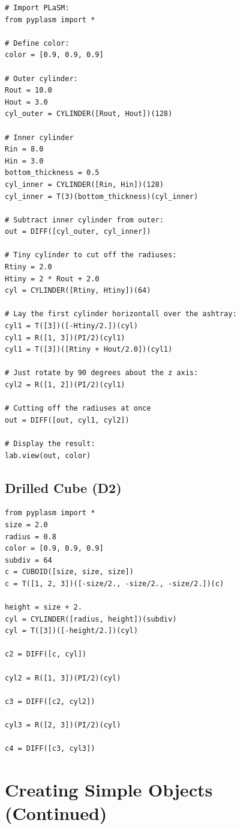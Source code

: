 \documentclass[article,A4,12pt]{llncs}
\begin{document}
\begin{verbatim}
# Import PLaSM:
from pyplasm import *

# Define color:
color = [0.9, 0.9, 0.9]

# Outer cylinder:
Rout = 10.0
Hout = 3.0
cyl_outer = CYLINDER([Rout, Hout])(128)

# Inner cylinder
Rin = 8.0
Hin = 3.0
bottom_thickness = 0.5
cyl_inner = CYLINDER([Rin, Hin])(128)
cyl_inner = T(3)(bottom_thickness)(cyl_inner)

# Subtract inner cylinder from outer:
out = DIFF([cyl_outer, cyl_inner])

# Tiny cylinder to cut off the radiuses:
Rtiny = 2.0
Htiny = 2 * Rout + 2.0
cyl = CYLINDER([Rtiny, Htiny])(64)

# Lay the first cylinder horizontall over the ashtray:
cyl1 = T([3])([-Htiny/2.])(cyl)
cyl1 = R([1, 3])(PI/2)(cyl1)
cyl1 = T([3])([Rtiny + Hout/2.0])(cyl1)

# Just rotate by 90 degrees about the z axis:
cyl2 = R([1, 2])(PI/2)(cyl1)

# Cutting off the radiuses at once
out = DIFF([out, cyl1, cyl2])
 
# Display the result:
lab.view(out, color)
\end{verbatim}

\subsection{Drilled Cube (D2)}

\begin{verbatim}
from pyplasm import *
size = 2.0
radius = 0.8
color = [0.9, 0.9, 0.9]
subdiv = 64
c = CUBOID([size, size, size])
c = T([1, 2, 3])([-size/2., -size/2., -size/2.])(c)

height = size + 2.
cyl = CYLINDER([radius, height])(subdiv)
cyl = T([3])([-height/2.])(cyl)

c2 = DIFF([c, cyl])

cyl2 = R([1, 3])(PI/2)(cyl)

c3 = DIFF([c2, cyl2])

cyl3 = R([2, 3])(PI/2)(cyl)

c4 = DIFF([c3, cyl3])
\end{verbatim}


\section{Creating Simple Objects (Continued)}
\end{document}
